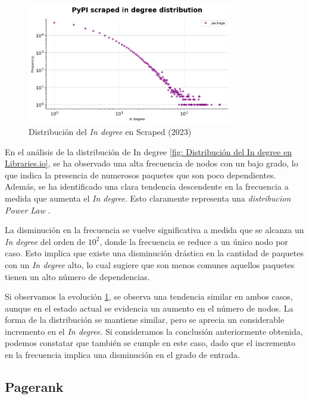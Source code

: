 \begin{figure}[ht!]
    \begin{center}
        \includegraphics[width=0.8\textwidth]{img/pypi/ind_scraped_dist.png}
        \caption{Distribución del \textit{In degree} en Scraped (2023)}
        \label{fig: Distribución del In degree en Scraped}
    \end{center}
\end{figure}

En el análisis de la distribución de In degree \ref{fig: Distribución del In degree en Libraries.io},
se ha observado una alta frecuencia de nodos con un bajo grado,
lo que indica la presencia de numerosos paquetes que son poco dependientes. Además, se ha identificado
una clara tendencia descendente en la frecuencia a medida que aumenta el \textit{In degree}.
Esto claramente representa una \textit{distribucion Power Law} \cite{enwiki:1160892030}.

La disminución en la frecuencia se vuelve significativa a medida que se alcanza un \textit{In degree} del orden
de $10^2$, donde la frecuencia se reduce a un único nodo por caso. Esto implica que existe una disminución drástica
en la cantidad de paquetes con un \textit{In degree} alto, lo cual sugiere que son menos comunes aquellos paquetes
tienen un alto número de dependencias.

Si observamos la evolución \ref{fig: Distribución del In degree en Scraped}, se observa una tendencia similar en ambos casos,
aunque en el estado actual se evidencia un aumento en el número de nodos. La forma de la distribución se mantiene similar,
pero se aprecia un considerable incremento en el \textit{In degree}. Si consideramos la conclusión anteriormente obtenida, podemos constatar que
también se cumple en este caso, dado que el incremento en la frecuencia implica una disminución en el grado de entrada.

\subsection{Pagerank}

